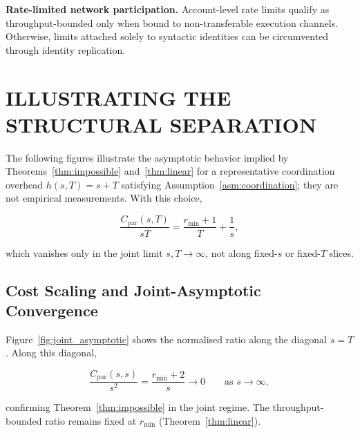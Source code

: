 \documentclass[manuscript,review]{acmart}
\theoremstyle{remark}
\begin{document}
	\noindent\textbf{Rate-limited network participation.}
	Account-level rate limits qualify as throughput-bounded
	only when bound to non-transferable execution channels.
	Otherwise, limits attached solely to syntactic identities
	can be circumvented through identity replication.
	\section{ILLUSTRATING THE STRUCTURAL SEPARATION}
	\label{sec:evaluation}
	
	The following figures illustrate the asymptotic
	behavior implied by Theorems~\ref{thm:impossible}
	and~\ref{thm:linear} for a representative coordination
	overhead $h(s,T)=s+T$ satisfying
	Assumption~\ref{asm:coordination}; they are not
	empirical measurements.
	With this choice,
	
	\[
	\frac{C_{\mathrm{par}}(s,T)}{sT}
	=
	\frac{r_{\min}+1}{T}
	+
	\frac{1}{s},
	\]
	
	which vanishes only in the joint limit $s,T\to\infty$, not along fixed-$s$ or fixed-$T$ slices.
	
	\subsection{Cost Scaling and Joint-Asymptotic Convergence}
	\label{ssec:eval_scaling}
	
	Figure~\ref{fig:joint_asymptotic} shows the normalised ratio along the diagonal $s=T$. Along this diagonal,
	
	\[
	\frac{C_{\mathrm{par}}(s,s)}{s^2}
	=
	\frac{r_{\min}+2}{s}
	\to 0
	\qquad\text{as } s\to\infty,
	\]
	
	confirming Theorem~\ref{thm:impossible} in the joint regime. The throughput-bounded ratio remains fixed at $r_{\min}$ (Theorem~\ref{thm:linear}).
	
\end{document}
